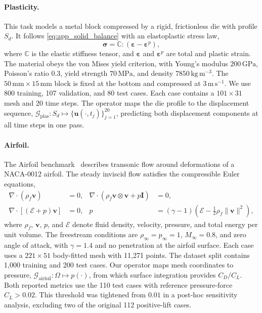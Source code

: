 \paragraph{Plasticity.}
This task models a metal block compressed by a rigid, frictionless die with profile $S_d$. It follows \eqref{eq:app_solid_balance} with an elastoplastic stress law,
\begin{equation}
    \boldsymbol{\sigma}=\mathbb{C}:(\boldsymbol{\varepsilon}-\boldsymbol{\varepsilon}^{p}),
    \label{eq:app_plasticity}
\end{equation}
where $\mathbb{C}$ is the elastic stiffness tensor, and $\boldsymbol{\varepsilon}$ and $\boldsymbol{\varepsilon}^{p}$ are total and plastic strain. The material obeys the von Mises yield criterion, with Young's modulus $200\,\mathrm{GPa}$, Poisson's ratio $0.3$, yield strength $70\,\mathrm{MPa}$, and density $7850\,\mathrm{kg\,m^{-3}}$. The $50\,\mathrm{mm}\times15\,\mathrm{mm}$ block is fixed at the bottom and compressed at $3\,\mathrm{m\,s^{-1}}$. We use 800 training, 107 validation, and 80 test cases. Each case contains a $101\times31$ mesh and 20 time steps. The operator maps the die profile to the displacement sequence, $\mathcal{G}_{\mathrm{plas}}:S_d\mapsto\{\mathbf{u}(\cdot,t_j)\}_{j=1}^{20}$, predicting both displacement components at all time steps in one pass.

\paragraph{Airfoil.}
The Airfoil benchmark~\citep{li2023geofno} describes transonic flow around deformations of a NACA-0012 airfoil. The steady inviscid flow satisfies the compressible Euler equations,
\begin{equation}
    \begin{aligned}
        \nabla\!\cdot(\rho_f\mathbf{v})&=0,
        &\nabla\!\cdot(\rho_f\mathbf{v}\otimes\mathbf{v}+p\mathbf{I})&=0,\\
        \nabla\!\cdot[(\mathcal{E}+p)\mathbf{v}]&=0,
        &p&=(\gamma-1)\left(\mathcal{E}-\tfrac12\rho_f\|\mathbf{v}\|^2\right),
    \end{aligned}
    \label{eq:app_airfoil}
\end{equation}
where $\rho_f$, $\mathbf{v}$, $p$, and $\mathcal{E}$ denote fluid density, velocity, pressure, and total energy per unit volume. The freestream conditions are $\rho_\infty=p_\infty=1$, $M_\infty=0.8$, and zero angle of attack, with $\gamma=1.4$ and no penetration at the airfoil surface. Each case uses a $221\times51$ body-fitted mesh with 11,271 points. The dataset split contains 1,000 training and 200 test cases. Our operator maps mesh coordinates to pressure, $\mathcal{G}_{\mathrm{airfoil}}:\Omega\mapsto p(\cdot)$, from which surface integration provides $C_D/C_L$. Both reported metrics use the 110 test cases with reference pressure-force $C_L>0.02$. This threshold was tightened from $0.01$ in a post-hoc sensitivity analysis, excluding two of the original 112 positive-lift cases.

